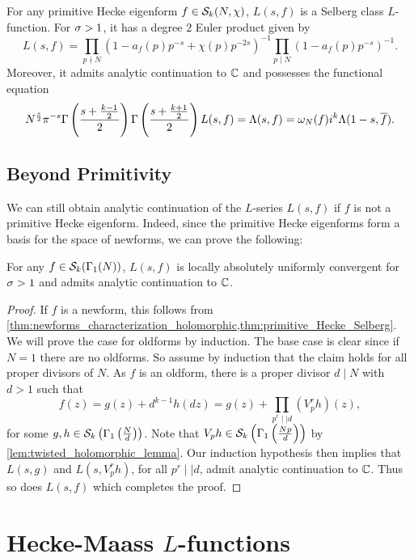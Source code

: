       \begin{theorem}\label{thm:primitive_Hecke_Selberg}
        For any primitive Hecke eigenform $f \in \mathcal{S}_{k}(N,\chi)$, $L(s,f)$ is a Selberg class $L$-function. For $\sigma > 1$, it has a degree $2$ Euler product given by 
        \[
          L(s,f) = \prod_{p \nmid N}(1-a_{f}(p)p^{-s}+\chi(p)p^{-2s})^{-1}\prod_{p \mid N}(1-a_{f}(p)p^{-s})^{-1}.
        \]
        Moreover, it admits analytic continuation to $\mathbb{C}$ and possesses the functional equation
        \[
          N^{\frac{s}{2}}\pi^{-s}\Gamma\left(\frac{s+\frac{k-1}{2}}{2}\right)\Gamma\left(\frac{s+\frac{k+1}{2}}{2}\right)L(s,f) = \Lambda(s,f) = \omega_{N}(f)i^{k}\Lambda(1-s,\overline{f}).
        \]
      \end{theorem}
    \subsection*{Beyond Primitivity}
      We can still obtain analytic continuation of the $L$-series $L(s,f)$ if $f$ is not a primitive Hecke eigenform. Indeed, since the primitive Hecke eigenforms form a basis for the space of newforms, we can prove the following:

      \begin{theorem}\label{thm:analytic_continuation_Hecke}
        For any $f \in \mathcal{S}_{k}(\Gamma_{1}(N))$, $L(s,f)$ is locally absolutely uniformly convergent for $\sigma > 1$ and admits analytic continuation to $\mathbb{C}$.
      \end{theorem}
      \begin{proof}
        If $f$ is a newform, this follows from \cref{thm:newforms_characterization_holomorphic,thm:primitive_Hecke_Selberg}. We will prove the case for oldforms by induction. The base case is clear since if $N = 1$ there are no oldforms. So assume by induction that the claim holds for all proper divisors of $N$. As $f$ is an oldform, there is a proper divisor $d \mid N$ with $d > 1$ such that
        \[
          f(z) = g(z)+d^{k-1}h(dz) = g(z)+\prod_{p^{r} \mid\mid d}(V_{p}^{r}h)(z),
        \]
        for some $g,h \in \mathcal{S}_{k}\left(\Gamma_{1}\left(\frac{N}{d}\right)\right)$. Note that $V_{p}h \in \mathcal{S}_{k}\left(\Gamma_{1}\left(\frac{Np}{d}\right)\right)$ by \cref{lem:twisted_holomorphic_lemma}. Our induction hypothesis then implies that $L(s,g)$ and $L(s,V_{p}^{r}h)$, for all $p^{r} \mid\mid d$, admit analytic continuation to $\mathbb{C}$. Thus so does $L(s,f)$ which completes the proof.
      \end{proof}
  \section{Hecke-Maass \texorpdfstring{$L$}{L}-functions}
